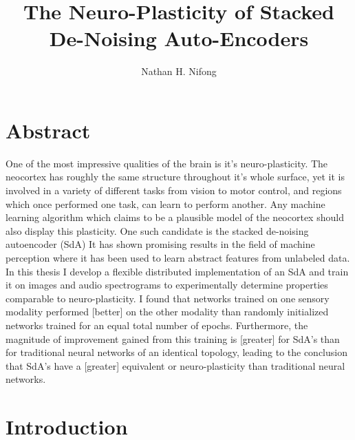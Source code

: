 \documentclass[12pt]{article}
\begin{document}
         

\title{The Neuro-Plasticity of Stacked De-Noising Auto-Encoders}
\author{Nathan H. Nifong}

\section{Abstract}
\label{Abstract}
\doublespacing

One of the most impressive qualities of the brain is it's neuro-plasticity. The neocortex has roughly the same structure throughout it's whole surface, yet it is involved in a variety of different tasks from vision to motor control, and regions which once performed one task, can learn to perform another. Any machine learning algorithm which claims to be a plausible model of the neocortex should also display this plasticity. One such candidate is the stacked de-noising autoencoder (SdA) It has shown promising results in the field of machine perception where it has been used to learn abstract features from unlabeled data. In this thesis I develop a flexible distributed implementation of an SdA and train it on images and audio spectrograms to experimentally determine properties comparable to neuro-plasticity. I found that networks trained on one sensory modality performed [better] on the other modality than randomly initialized networks trained for an equal total number of epochs. Furthermore, the magnitude of improvement gained from this training is [greater] for SdA's than for traditional neural networks of an identical topology, leading to the conclusion that SdA's have a [greater] equivalent or neuro-plasticity than traditional neural networks.

\tableofcontents

\section{Introduction}
\end{document}
